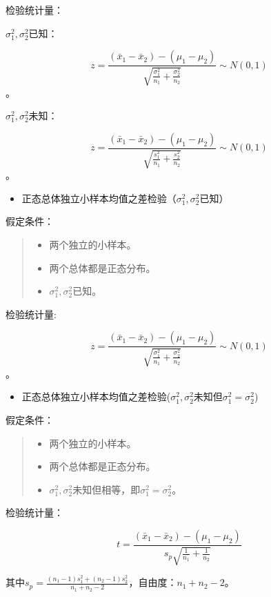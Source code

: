 \documentclass[]{ctexbook}
\providecommand{\tightlist}{%
  \setlength{\itemsep}{0pt}\setlength{\parskip}{0pt}}
\begin{document}
检验统计量：

\(\sigma_1^2,\sigma_2^2\)已知：

\[z=\frac{(\bar x_1-\bar x_2)-(\mu_1-\mu_2)}{\sqrt{\frac{\sigma_1^2}{n_1}+\frac{\sigma_2^2}{n_2}}}\sim N(0,1)\]。

\(\sigma_1^2,\sigma_2^2\)未知：

\[z=\frac{(\bar x_1-\bar x_2)-(\mu_1-\mu_2)}{\sqrt{\frac{s_1^2}{n_1}+\frac{s_2^2}{n_2}}}\sim N(0,1)\]。

\begin{itemize}
\tightlist
\item
  正态总体独立小样本均值之差检验（\(\sigma_1^2,\sigma_2^2\)已知）
\end{itemize}

假定条件：

\begin{quote}
\begin{itemize}
\tightlist
\item
  两个独立的小样本。
\item
  两个总体都是正态分布。
\item
  \(\sigma_1^2,\sigma_2^2\)已知。
\end{itemize}
\end{quote}

检验统计量:

\[z=\frac{(\bar x_1-\bar x_2)-(\mu_1-\mu_2)}{\sqrt{\frac{\sigma_1^2}{n_1}+\frac{\sigma_2^2}{n_2}}}\sim N(0,1)\]。

\begin{itemize}
\tightlist
\item
  正态总体独立小样本均值之差检验(\(\sigma_1^2,\sigma_2^2\)未知但\(\sigma_1^2=\sigma_2^2\))
\end{itemize}

假定条件：

\begin{quote}
\begin{itemize}
\tightlist
\item
  两个独立的小样本。
\item
  两个总体都是正态分布。
\item
  \(\sigma_1^2,\sigma_2^2\)未知但相等，即\(\sigma_1^2=\sigma_2^2\)。
\end{itemize}
\end{quote}

检验统计量：

\[t=\frac{(\bar x_1-\bar x_2)-(\mu_1-\mu_2)}{s_p\sqrt{\frac{1}{n_1}+\frac{1}{n_2}}}\]

其中\(s_p=\frac{(n_1-1)s_1^2+(n_2-1)s_2^2}{n_1+n_2-2}\)，自由度：\(n_1+n_2-2\)。
\end{document}
